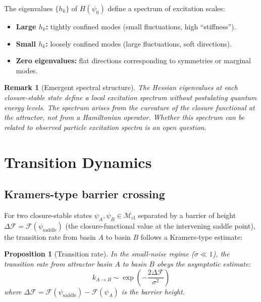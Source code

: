\documentclass[12pt]{article}
\newtheorem{proposition}[theorem]{Proposition}
\newtheorem{remark}[theorem]{Remark}
\newcommand{\Mcl}{\mathcal{M}_{\mathrm{cl}}}
\newcommand{\Fcal}{\mathcal{F}}
\begin{document}
The eigenvalues $\{h_k\}$ of $H(\psi_0)$ define a spectrum of excitation scales:
\begin{itemize}
    \item \textbf{Large $h_k$:} tightly confined modes (small fluctuations, high ``stiffness'').
    \item \textbf{Small $h_k$:} loosely confined modes (large fluctuations, soft directions).
    \item \textbf{Zero eigenvalues:} flat directions corresponding to symmetries or marginal modes.
\end{itemize}

\begin{remark}[Emergent spectral structure]
The Hessian eigenvalues at each closure-stable state define a local excitation spectrum without postulating quantum energy levels. The spectrum arises from the curvature of the closure functional at the attractor, not from a Hamiltonian operator. Whether this spectrum can be related to observed particle excitation spectra is an open question.
\end{remark}

\section{Transition Dynamics}\label{sec:transitions}

\subsection{Kramers-type barrier crossing}

For two closure-stable states $\psi_A, \psi_B \in \Mcl$ separated by a barrier of height $\Delta\Fcal = \Fcal(\psi_{\mathrm{saddle}})$ (the closure-functional value at the intervening saddle point), the transition rate from basin $A$ to basin $B$ follows a Kramers-type estimate:

\begin{proposition}[Transition rate]\label{prop:kramers}
In the small-noise regime ($\sigma \ll 1$), the transition rate from attractor basin $A$ to basin $B$ obeys the asymptotic estimate:
\begin{equation}\label{eq:kramers}
    k_{A \to B} \sim \exp\!\left(-\frac{2\Delta\Fcal}{\sigma^2}\right)
\end{equation}
where $\Delta\Fcal = \Fcal(\psi_{\mathrm{saddle}}) - \Fcal(\psi_A)$ is the barrier height.
\end{proposition}
\end{document}
